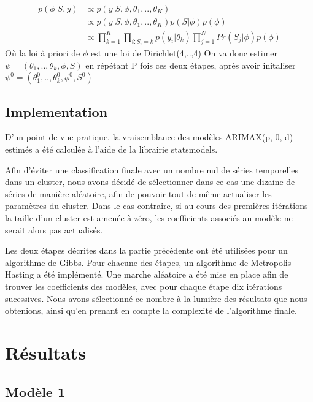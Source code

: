 \begin{equation}
    \begin{split}
        p(\phi|S,y) &\propto p(y|S,\phi,\theta_1,..,\theta_K) \\
                    &\propto p(y|S,\phi,\theta_1,..,\theta_K)p(S|\phi)p(\phi)\\
                    &\propto \prod_{k=1}^{K} \prod_{i : S_i = k} p(y_i|\theta_k) \prod_{j = 1}^{N}Pr(S_j|\phi)p(\phi)
    \end{split}
\end{equation}
Où la loi à priori de $\phi$ est une loi de Dirichlet(4,..,4)
\newline
On va donc estimer $\psi = (\theta_1,..,\theta_k,\phi,S)$ en répétant P fois ces deux étapes, après avoir initaliser $\psi^{0} = (\theta_1^{0},..,\theta_k^{0},\phi^{0},S^{0})$

\subsection{Implementation}

D'un point de vue pratique, la vraisemblance des modèles ARIMAX(p, 0, d) estimés a été calculée à l'aide de la librairie statsmodels. 

Afin d'éviter une classification finale avec un nombre nul de séries temporelles dans un cluster, nous avons décidé de sélectionner dans ce cas une dizaine de séries de manière aléatoire, afin de pouvoir tout de même actualiser les paramètres du cluster. Dans le cas contraire, si au cours des premières itérations la taille d'un cluster est amenée à zéro, les coefficients associés au modèle ne serait alors pas actualisés.

Les deux étapes décrites dans la partie précédente ont été utilisées pour un algorithme de Gibbs. Pour chacune des étapes, un algorithme de Metropolis Hasting a été implémenté. Une marche aléatoire a été mise en place afin de trouver les coefficients des modèles, avec pour chaque étape dix itérations sucessives. Nous avons sélectionné ce nombre à la lumière des résultats que nous obtenions, ainsi qu'en prenant en compte la complexité de l'algorithme finale. 

\section{Résultats}
\subsection{Modèle 1}

